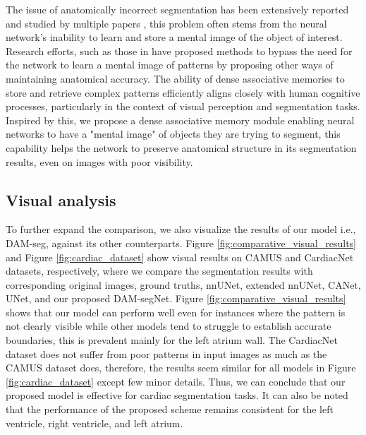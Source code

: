 \documentclass[preprint,12pt]{elsarticle}
\begin{document}
The issue of anatomically incorrect segmentation has been extensively reported and studied by multiple papers \cite{adiga2024anatomically,van2024towards,wyburd2024anatomically,gao2023anatomy,von2023anatomically}, this problem often stems from the neural network's inability to learn and store a mental image of the object of interest. Research efforts, such as those in \cite{VAE_wrapping, GCN} have proposed methods to bypass the need for the network to learn a mental image of patterns by proposing other ways of maintaining anatomical accuracy.
The ability of dense associative memories to store and retrieve complex patterns efficiently aligns closely with human cognitive processes, particularly in the context of visual perception and segmentation tasks. Inspired by this, we propose a dense associative memory module enabling neural networks to have a "mental image" of objects they are trying to segment, this capability helps the network to preserve anatomical structure in its segmentation results, even on images with poor visibility.








\subsection{Visual analysis}

To further expand the comparison, we also visualize the results of our model i.e., DAM-seg, against its other counterparts. Figure \ref{fig:comparative_visual_results} and Figure \ref{fig:cardiac_dataset} show visual results on CAMUS and CardiacNet datasets, respectively, where we compare the segmentation results with corresponding original images, ground truths, nnUNet, extended nnUNet, CANet, UNet, and our proposed DAM-segNet. Figure \ref{fig:comparative_visual_results} shows that our model can perform well even for instances where the pattern is not clearly visible while other models tend to struggle to establish accurate boundaries, this is prevalent mainly for the left atrium wall. The CardiacNet dataset does not suffer from poor patterns in input images as much as the CAMUS dataset does, therefore, the results seem similar for all models in Figure \ref{fig:cardiac_dataset} except few minor details. Thus, we can conclude that our proposed model is effective for cardiac
segmentation tasks. It can also be noted that the performance of the proposed scheme remains consistent for the left ventricle, right ventricle, and left atrium.
\end{document}
